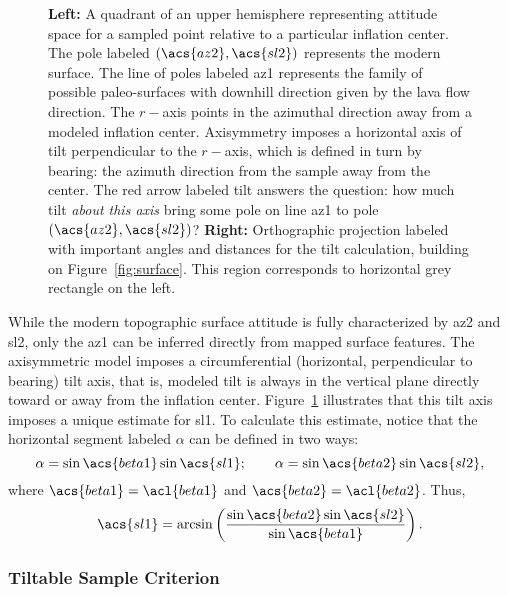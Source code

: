 \begin{figure}
\begin{center}
    \caption[\Acl{tilt} from mapping]{\textbf{Left:} A quadrant of an upper hemisphere representing attitude space for a sampled point relative to a particular inflation center. The pole labeled $\left(\acs{az2},\acs{sl2}\right)$ represents the modern surface. The line of poles labeled \acs{az1} represents the family of possible paleo-surfaces with downhill direction given by the lava flow direction. The $r-$axis points in the azimuthal direction away from a modeled inflation center. Axisymmetry imposes a horizontal axis of tilt perpendicular to the $r-$axis, which is defined in turn by \acs{bearing}: the azimuth direction from the sample away from the center. The red arrow labeled \acs{tilt} answers the question: how much tilt \emph{about this axis} bring some pole on line \acs{az1} to pole $\left(\acs{az2},\acs{sl2}\right)$? \textbf{Right:} Orthographic projection labeled with important angles and distances for the tilt calculation, building on Figure~\ref{fig:surface}. This region corresponds to horizontal grey rectangle on the left.}%
    \label{fig:tilt-from-map}%
\end{center}
\end{figure}
While the modern topographic surface attitude is fully characterized by \acf{az2} and \acf{sl2}, only the \acf{az1} can be inferred directly from mapped surface features. The axisymmetric model imposes a circumferential (horizontal, perpendicular to \acs{bearing}) tilt axis, that is, modeled tilt is always in the vertical plane directly toward or away from the inflation center. Figure~\ref{fig:tilt-from-map} illustrates that this tilt axis imposes a unique estimate for \acf{sl1}. To calculate this estimate, notice that the horizontal segment labeled $\alpha$ can be defined in two ways:
\begin{equation*}
    \alpha = \sin\acs{beta1}\sin\acs{sl1};\qquad
    \alpha = \sin\acs{beta2}\sin\acs{sl2},
\end{equation*}
where $\acs{beta1} = \acl{beta1}$ and $\acs{beta2} = \acl{beta2}$. Thus,
\begin{equation}
    \acs{sl1} = \arcsin\left(\frac{\sin\acs{beta2}\sin\acs{sl2}}{\sin\acs{beta1}}\right).\label{eq:paleo-slope}
\end{equation}

\subsubsection{Tiltable Sample Criterion}\label{sec:tiltable}

